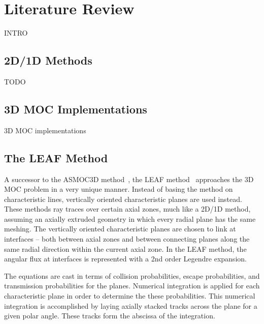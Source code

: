 \chapter{Literature Review}
\label{chap:literature-review}

INTRO

\section{2D/1D Methods}
\label{sec:2d_1d}
TODO



\section{3D MOC Implementations}
\label{sec:3d-imp}

3D MOC implementations

\section{The LEAF Method}
\label{sec:leaf}

A successor to the ASMOC3D method~\cite{pre_leaf}, the LEAF method~\cite{leaf_init, leaf_method} approaches the 3D \ac{MOC} problem in a very unique manner. Instead of basing the method on characteristic lines, vertically oriented characteristic planes are used instead. These methods ray traces over certain axial zones, much like a 2D/1D method, assuming an axially extruded geometry in which every radial plane has the same meshing. The vertically oriented characteristic planes are chosen to link at interfaces -- both between axial zones and between connecting planes along the same radial direction within the current axial zone. In the LEAF method, the angular flux at interfaces is represented with a 2nd order Legendre expansion.

The equations are cast in terms of collision probabilities, escape probabilities, and transmission probabilities for the planes. Numerical integration is applied for each characteristic plane in order to determine the these probabilities. This numerical integration is accomplished by laying axially stacked tracks across the plane for a given polar angle. These tracks form the abscissa of the integration. 

